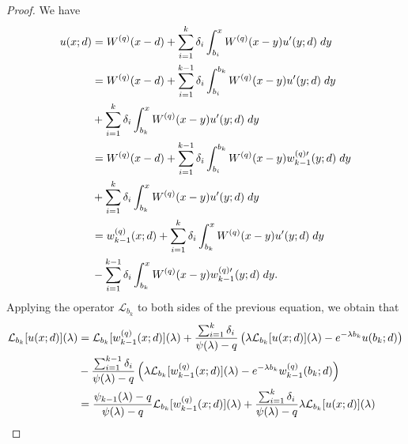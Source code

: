 \documentclass[12pt,reqno]{amsart}
\newcommand{\red}{\textcolor[rgb]{1.00,0.00,0.00}}
\newcommand{\blue}{\textcolor[rgb]{0.00,0.00,1.00}}
\theoremstyle{definition}
\theoremstyle{remark}
\begin{document}
\begin{proof}
We have
\begin{align*}
u(x;d)&=W^{(q)}(x-d)+\sum_{i=1}^k\delta_i\int_{b_i}^xW^{(q)}(x-y)u^{\prime}(y;d)\;dy\notag\\
&=W^{(q)}(x-d)+\sum_{i=1}^{k-1}\delta_i\int_{b_i}^{b_k}W^{(q)}(x-y)u^{\prime}(y;d)\;dy\\
&+\sum_{i=1}^k\delta_i\int_{b_k}^xW^{(q)}(x-y)u^{\prime}(y;d)\;dy\notag\\
&=W^{(q)}(x-d)+\sum_{i=1}^{k-1}\delta_i\int_{b_i}^{b_k}W^{(q)}(x-y)w_{k-1}^{(q)\prime}(y;d)\;dy\\
&+\sum_{i=1}^k\delta_i\int_{b_k}^xW^{(q)}(x-y)u^{\prime}(y;d)\;dy\notag\\
&=w_{k-1}^{(q)}(x;d)+\sum_{i=1}^k\delta_i\int_{b_k}^xW^{(q)}(x-y)u^{\prime}(y;d)\;dy\\
&-\sum_{i=1}^{k-1}\delta_i\int_{b_k}^xW^{(q)}(x-y)w_{k-1}^{(q)\prime}(y;d)\;dy.\notag
\end{align*}
Applying the operator $\mathcal{L}_{b_k}$ to both sides of the previous equation, we obtain that
\begin{align*}
\mathcal{L}_{b_k}[u(x;d)](\lambda)&=\mathcal{L}_{b_k}[w_{k-1}^{(q)}(x;d)](\lambda)+
\frac{\sum_{i=1}^k\delta_i}{\psi(\lambda)-q}\left(\lambda\mathcal{L}_{b_k}[u(x;d)](\lambda)-e^{-\lambda b_k}u(b_k;d)\right)\notag\\
&-\frac{\sum_{i=1}^{k-1}\delta_i}{\psi(\lambda)-q}\left(\lambda\mathcal{L}_{b_k}[w_{k-1}^{(q)}(x;d)](\lambda)-e^{-\lambda b_k}w_{k-1}^{(q)}(b_k;d)\right)\notag\\
&=\frac{\psi_{k-1}(\lambda)-q}{\psi(\lambda)-q}\mathcal{L}_{b_k}[w_{k-1}^{(q)}(x;d)](\lambda)+\frac{\sum_{i=1}^k\delta_i}{\psi(\lambda)-q}
\lambda\mathcal{L}_{b_k}[u(x;d)](\lambda)\notag\\

\end{align*}
\end{proof}
\end{document}
